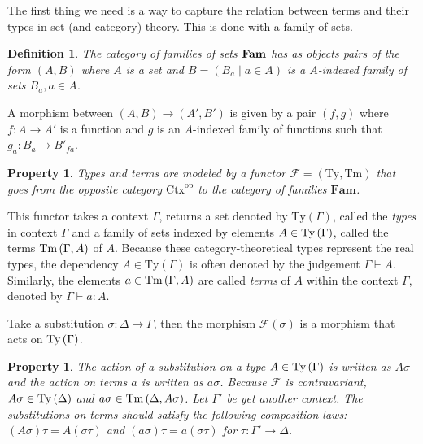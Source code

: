 \documentclass[12pt,a4paper,twoside,xetex,draft]{book}
\newcommand{\keyword}[1]{\emph{#1}\index{#1}}
\newtheorem{definition}[theorem]{Definition}
\newtheorem{property}[theorem]{Property}
\begin{document}
The first thing we need is a way to capture the relation between terms and their types in set (and category) theory. This is done with a family of sets. 

\begin{definition}
The category of  \keyword{families of sets} $ \text{\textbf{Fam}}$ has as objects pairs of the form $\left(A,B\right)$ where $A$ is a set and $B=\left(B_{a}\mid a\in A\right)$ is a $A$-indexed family of sets $B_{a},a\in A$. 
\end{definition}

A morphism between $\left(A,B\right)\rightarrow\left(A',B'\right)$ is given by a pair $\left(f,g\right)$ where $f:A\rightarrow A'$ is a function and $g$ is an $A$-indexed family of functions such that $g_{a}:B_{a}\rightarrow B'_{fa}$.


\begin{property}\label{type_functor} Types and terms are modeled by a functor $\mathcal{F}=\left(\text{Ty},\text{Tm}\right)$ that goes from the opposite category $\text{Ctx}^{\text{op}}$ to the category of families $\textbf{Fam}$.
\end{property}

This functor takes a context $\Gamma$, returns a set denoted by $\text{Ty}\left(\Gamma\right)$, called the \keyword{types} in context $\Gamma$ and a family of sets indexed by elements $A\in\text{Ty}\left(\Gamma\right)$, called the terms $\text{Tm}\left(\Gamma,A\right)$ of $A$. Because these category-theoretical types represent the real types, the dependency $A \in \text{Ty}(\Gamma)$ is often denoted by the judgement $\Gamma\vdash A$. Similarly, the elements $a\in\text{Tm}\left(\Gamma,A\right)$ are called \keyword{terms} of $A$ within the context $\Gamma$, denoted by $\Gamma\vdash a:A$.

 Take a substitution $\sigma:\Delta\rightarrow\Gamma$, then the morphism $\mathcal{F}(\sigma)$ is a morphism that acts on $\text{Ty}\left(\Gamma\right)$. 

\begin{property}\label{composition_laws}
The action of a substitution on a type $A\in\text{Ty}\left(\Gamma\right)$ is written as $A\sigma$ and the action on terms $a$ is written as $a\sigma$. Because $\mathcal{F}$ is contravariant, $A \sigma\in \text{Ty}\left(\Delta\right)$ and $a \sigma \in \text{Tm}\left(\Delta,A \sigma\right)$. Let $\Gamma '$ be yet another context. The substitutions on terms should satisfy
the following composition laws: $\left(A\sigma\right)\tau=A\left(\sigma\tau\right)$
and $\left(a\sigma\right)\tau=a\left(\sigma\tau\right)$ for $\tau:\Gamma'\rightarrow\Delta$.
\end{property}
\end{document}
